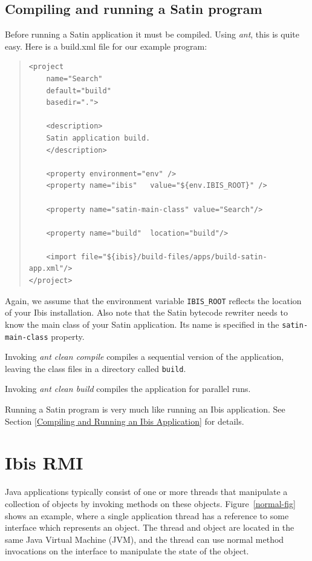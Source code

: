 \documentclass[10pt]{article}
\newcommand{\mysection}[1]{\section{#1}\label{#1}}
\newcommand{\mysubsection}[1]{\subsection{#1}\label{#1}}
\begin{document}
\mysubsection{Compiling and running a Satin program}

Before running a Satin application it must be compiled.
Using \emph{ant}, this is quite easy. Here is a build.xml file for
our example program:

{\small
\begin{quote}
\begin{verbatim}
<project
    name="Search"
    default="build"
    basedir=".">

    <description>
    Satin application build.
    </description>

    <property environment="env" />
    <property name="ibis"   value="${env.IBIS_ROOT}" />

    <property name="satin-main-class" value="Search"/>

    <property name="build"  location="build"/>

    <import file="${ibis}/build-files/apps/build-satin-app.xml"/>
</project>
\end{verbatim}
\end{quote}
}

Again, we assume that the environment variable \texttt{IBIS\_ROOT} reflects
the location of your Ibis installation.
Also note that the Satin bytecode rewriter needs to know the main class of your
Satin application.
Its name is specified in the \texttt{satin-main-class} property.

Invoking \emph{ant clean compile} compiles a sequential version
of the application, 
leaving the class files in a directory called \texttt{build}.

Invoking \emph{ant clean build} compiles the application for parallel
runs.

Running a Satin program is very much like running an Ibis application.
See Section \ref{Compiling and Running an Ibis Application} for details.

\mysection{Ibis RMI}

Java applications typically consist of one or more threads that
manipulate a collection of objects by invoking methods on these
objects. Figure~\ref{normal-fig} shows an example, where a single application thread
has a reference to some interface which represents an object. The
thread and object are located in the same Java Virtual Machine (JVM),
and the thread can use normal method invocations on the interface to
manipulate the state of the object.
\end{document}
